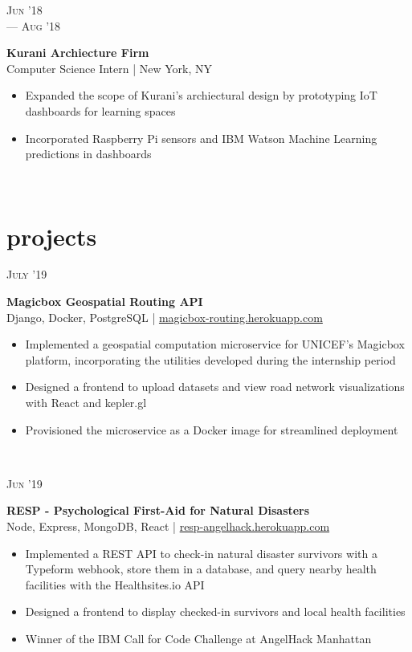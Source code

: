 \documentclass[letterpaper, 10.5pt]{article}
\newcommand{\expentry}[5]{
    \begin{minipage}[t]{.15\linewidth}
    \hfill \textsc{#1} \\
    \hfill \hspace*{5pt}\hfill --- \textsc{#2}
    \end{minipage}
    \hfill\vline\hfill
    \begin{minipage}[t]{.80\linewidth}
    {\bf\large#3}
    \\ #4 
    \vspace{-1.5mm}
    \small{#5}
    \end{minipage}\\
    \vspace{.125cm}
    }
\newcommand{\projectentry}[4]{
    \begin{minipage}[t]{.15\linewidth}
    \hfill \textsc{#1}
    \end{minipage}
    \hfill\vline\hfill
    \begin{minipage}[t]{.80\linewidth}
    {\bf#2}
    \\ #3 
    \vspace{-1.0mm}
    \small{#4}
    \end{minipage}\\
    \vspace{.125cm}
    }
\begin{document}
    \expentry{Jun '18}
    {Aug '18}
    {Kurani Archiecture Firm}
    {Computer Science Intern | New York, NY}
    {\begin{itemize}
          \setlength\itemsep{0.1mm}
          \item Expanded the scope of Kurani's archiectural design by prototyping IoT dashboards for learning spaces
          \item Incorporated Raspberry Pi sensors and IBM Watson Machine Learning predictions in dashboards
        \end{itemize}
    }

    \section{projects}

        \projectentry{July '19}
            {Magicbox Geospatial Routing API}
            {Django, Docker, PostgreSQL | \href{https://magicbox-routing.herokuapp.com}{magicbox-routing.herokuapp.com}}
            {\begin{itemize}
                \setlength\itemsep{0.1mm}
                \item Implemented a geospatial computation microservice for UNICEF's Magicbox platform, incorporating the utilities developed during the internship period
                \item Designed a frontend to upload datasets and view road network visualizations with React and kepler.gl
                \item Provisioned the microservice as a Docker image for streamlined deployment
            \end{itemize}
            }

        \projectentry{Jun '19}
            {RESP - Psychological First-Aid for Natural Disasters}
            {Node, Express, MongoDB, React | \href{https://resp-angelhack.herokuapp.com}{resp-angelhack.herokuapp.com}}
            {\begin{itemize}
                \setlength\itemsep{0.1mm}
                \item Implemented a REST API to check-in natural disaster survivors with a Typeform webhook, store them in a database, and query nearby health facilities with the Healthsites.io API
                \item Designed a frontend  to display checked-in survivors and local health facilities
                \item Winner of the IBM Call for Code Challenge at AngelHack Manhattan
            \end{itemize}
            }
            
\end{document}
